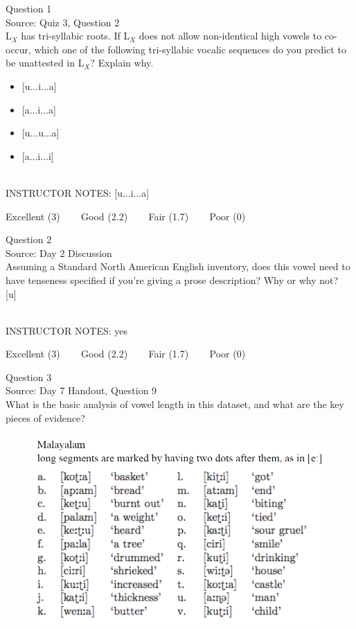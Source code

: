 \documentclass[12pt]{article}
\begin{document}
{\large Question 1}\\

Source: Quiz 3, Question 2\\

L$_X$ has tri-syllabic roots. If L$_X$ does not allow non-identical high vowels to co-occur, which one of the following tri-syllabic vocalic sequences do you predict to be unattested in L$_X$? Explain why.\\

\begin{itemize} \item {[u...i...a]} \item {[a...i...a]} \item {[u...u...a]} \item {[a...i...i]} \end{itemize}


~\\
INSTRUCTOR NOTES: [u...i...a]


\vfill
Excellent (3) ~~~ Good (2.2) ~~~ Fair (1.7) ~~~ Poor (0)
\newpage

{\large Question 2}\\

Source: Day 2 Discussion\\

Assuming a Standard North American English inventory, does this vowel need to have tenseness specified if you're giving a prose description? Why or why not?\\

{[u]}


~\\
INSTRUCTOR NOTES: yes


\vfill
Excellent (3) ~~~ Good (2.2) ~~~ Fair (1.7) ~~~ Poor (0)
\newpage

{\large Question 3}\\

Source: Day 7 Handout, Question 9\\

What is the basic analysis of vowel length in this dataset, and what are the key pieces of evidence?\\

\begin{figure}[H]
\includegraphics{../images/malayalam.png}
\end{figure}
\end{document}
